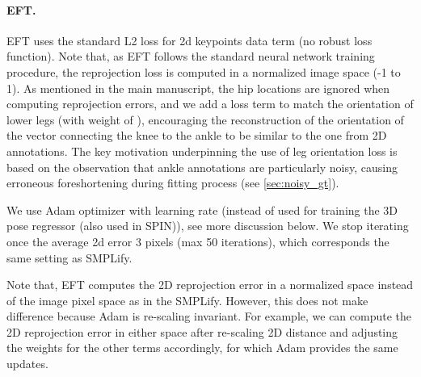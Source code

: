 \documentclass[10pt,twocolumn,letterpaper]{article}
\begin{document}
	\paragraph{EFT.}
	EFT uses the standard L2 loss for 2d keypoints data term (no robust loss function). Note that, as EFT follows the standard neural network training procedure, the reprojection loss is computed in a normalized image space (-1 to 1). 
As mentioned in the main manuscript, the hip locations are ignored when computing reprojection errors, and we add a loss term to match the orientation of lower legs (with weight of ), encouraging the reconstruction of the orientation of the vector connecting the knee to the ankle to be similar to the one from 2D annotations. The key motivation underpinning the use of leg orientation loss is based on the observation that ankle annotations are particularly noisy, causing erroneous foreshortening during fitting process (see \cref{sec:noisy_gt}).
	
	We use Adam optimizer with learning rate  (instead of 
	 used for training the 3D pose regressor (also used in SPIN)), see more discussion below. We stop iterating once the average 2d error  3 pixels (max 50 iterations), which corresponds the same setting as SMPLify.
	
	Note that, EFT computes the 2D reprojection error in a normalized space instead of the image pixel space as in the SMPLify. However, this does not make difference because Adam is re-scaling invariant. For example, we can compute the 2D reprojection error in either space after re-scaling 2D distance and adjusting the weights for the other terms accordingly, for which Adam provides the same updates. 
	
\end{document}
